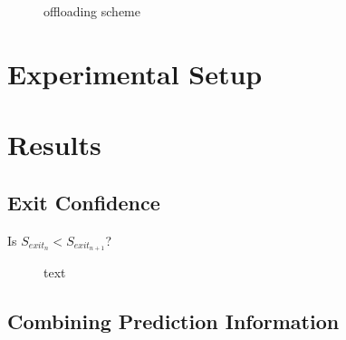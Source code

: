 \begin{figure}
	\caption[Offloading scheme]{offloading scheme}
	\label{fig:offloading-scheme}
\end{figure} 

\section{Experimental Setup}

\section{Results}

\subsection{Exit Confidence}

Is $S_{exit_{n}} < S_{exit_{n+1}}$?


\begin{figure}
	\centering
	\hfill
	\caption[short text]{text}
	\label{fig:exit-highscore}
\end{figure}

\subsection{Combining Prediction Information}


